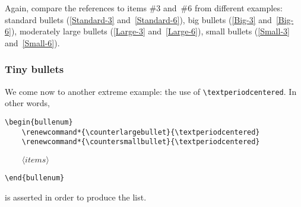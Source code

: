 \documentclass[a4paper]{article}
\DeclareRobustCommand*{\meta}[1]{\mbox{\(\langle\textit{#1}\rangle\)}}
\begin{document}
Again, compare the references to items \#3 and~\#6 from different
examples: standard bullets (\ref{Standard-3} and~\ref{Standard-6}),
big bullets (\ref{Big-3} and~\ref{Big-6}), moderately large bullets
(\ref{Large-3} and~\ref{Large-6}), small bullets (\ref{Small-3}
and~\ref{Small-6}).



\subsubsection{Tiny bullets}
\label{SSS:Xmp-Tiny}

We come now to another extreme example: the use of
\verb|\textperiodcentered|.  In other words,
%
\begin{verbatim}
\begin{bullenum}
    \renewcommand*{\counterlargebullet}{\textperiodcentered}
    \renewcommand*{\countersmallbullet}{\textperiodcentered}
\end{verbatim}
\begin{flushleft}
	\texttt{\ \ \ \ }\meta{items}
\end{flushleft}
\begin{verbatim}
\end{bullenum}
\end{verbatim}
%
is asserted in order to produce the list.
\end{document}
